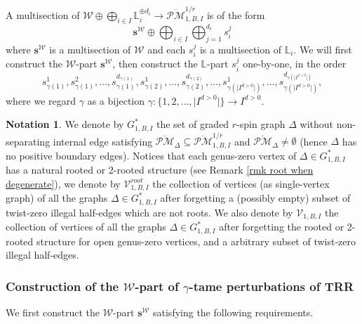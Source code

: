 \documentclass[11pt]{amsart}
\theoremstyle{definition}
\newtheorem{nn}[dummy]{Notation}
\theoremstyle{remark}
\newcommand{\oPMb}{{\overline{\mathcal{PM}}}}
\newcommand{\<}{\left<}
\renewcommand{\>}{\right>}
\numberwithin{equation}{section}
\begin{document}
A multisection of $\mathcal W \oplus \bigoplus_{i\in I} \mathbb L_i^{\oplus d_i}\to \oPMb_{1,B,I}^{1/r}$ is of the form
$$
\bm{s}^{\mathcal W}\oplus \bigoplus_{i\in I} \bigoplus_{j=1}^{d_i} s_i^j
$$
where $\bm{s}^{\mathcal W}$ is a multisection of $\mathcal W$ and each $s_i^j$ is a multisection of $\mathbb L_i$. 
We will first construct the $\mathcal W$-part $\bm{s}^{\mathcal W}$, then construct the $\mathbb L$-part $s_i^j$ one-by-one, in the order 
$$s_{\gamma(1)}^1, s_{\gamma(1)}^2, \dots, s_{\gamma(1)}^{d_{\gamma(1)}}, s_{\gamma(2)}^1, \dots, s_{\gamma(2)}^{d_{\gamma(2)}}, \dots, s_{\gamma(\lvert I^{d>0}\rvert)}^1, \dots, s_{\gamma(\lvert I^{d>0}\rvert)}^{d_{\gamma(\lvert I^{d>0}\rvert)}},$$
where we regard $\gamma$ as a bijection $\gamma \colon \{1,2,\dots, \lvert I^{d>0}\rvert\} \to I^{d>0}$.

\begin{nn}\label{notation collection of vertices}
    We denote by $G_{1,B,I}^*$ the set of graded $r$-spin graph $\Delta$ without  non-separating internal edge satisfying $\oPMb_\Delta\subseteq \oPMb^{1/r}_{1,B,I}$ and $\oPMb_\Delta\ne \emptyset$ (hence $\Delta$ has no positive boundary edges). 
    Notices that each genus-zero vertex of $\Delta \in G_{1,B,I}^*$  has a natural rooted or 2-rooted structure (see Remark \ref{rmk root when degenerate}), 
we denote by $\mathcal V_{1,B,I}^{root}$ the collection of vertices (as single-vertex graph) of all the graphs $\Delta\in G^*_{1,B,I}$ after forgetting a (possibly empty) subset of twist-zero illegal half-edges which are not roots.
We also denote by $\mathcal V_{1,B,I}$ the collection of vertices of all the graphs $\Delta\in G^*_{1,B,I}$ after forgetting the rooted or 2-rooted structure for open genus-zero vertices, and a arbitrary subset of twist-zero illegal half-edges.
\end{nn}

\subsubsection{Construction of the $\mathcal W$-part of $\gamma$-tame perturbations of TRR}\label{sec construction of tame W part}



We first construct the $\mathcal W$-part $\bm{s}^{\mathcal W}$ satisfying the following requirements.
\end{document}
